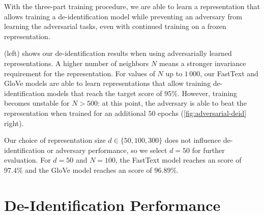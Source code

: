 %
With the three-part training procedure, we are able to learn a representation that allows training a de-identification model while preventing an adversary from learning the adversarial tasks, even with continued training on a frozen representation.

%
 (left) shows our de-identification results when using adversarially learned representations.
%
A higher number of neighbors $N$ means a stronger invariance requirement for the representation.
%
For values of $N$ up to $1\,000$, our FastText and GloVe models are able to learn representations that allow training de-identification models that reach the target \fone score of $95\%$.
%
However, training becomes unstable for $N>500$: at this point, the adversary is able to beat the representation when trained for an additional $50$ epochs (\cref{fig:adversarial-deid} right).

%
Our choice of representation size $d \in \{50, 100, 300\}$ does not influence de-identifi\-ca\-tion or adversary performance, so we select $d=50$ for further evaluation.
%
For $d=50$ and $N=100$, the FastText model reaches an \fone score of $97.4\%$ and the GloVe model reaches an \fone score of $96.89\%$.

\begin{figure*}
    \centering
    
    \caption[De-identification with adversarially learned representations]{%
        Left: de-identification \fone scores of our models using an adversarially trained representation with different numbers of neighbors $N$ for the representation invariance requirement.
        Right: mean adversary accuracy when trained on the frozen representation for an additional $50$ epochs.
    }\label{fig:adversarial-deid}
\end{figure*}

\section{De-Identification Performance}


